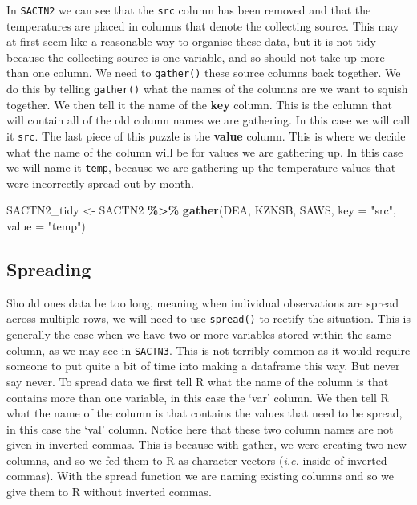 \documentclass[
]{book}
\newenvironment{Shaded}{\begin{snugshade}}{\end{snugshade}}
\newcommand{\DataTypeTok}[1]{\textcolor[rgb]{0.13,0.29,0.53}{#1}}
\newcommand{\KeywordTok}[1]{\textcolor[rgb]{0.13,0.29,0.53}{\textbf{#1}}}
\newcommand{\NormalTok}[1]{#1}
\newcommand{\OperatorTok}[1]{\textcolor[rgb]{0.81,0.36,0.00}{\textbf{#1}}}
\newcommand{\StringTok}[1]{\textcolor[rgb]{0.31,0.60,0.02}{#1}}
\begin{document}
In \texttt{SACTN2} we can see that the \texttt{src} column has been removed and that the temperatures are placed in columns that denote the collecting source. This may at first seem like a reasonable way to organise these data, but it is not tidy because the collecting source is one variable, and so should not take up more than one column. We need to \texttt{gather()} these source columns back together. We do this by telling \texttt{gather()} what the names of the columns are we want to squish together. We then tell it the name of the \textbf{key} column. This is the column that will contain all of the old column names we are gathering. In this case we will call it \texttt{src}. The last piece of this puzzle is the \textbf{value} column. This is where we decide what the name of the column will be for values we are gathering up. In this case we will name it \texttt{temp}, because we are gathering up the temperature values that were incorrectly spread out by month.

\begin{Shaded}
\begin{Highlighting}[]
\NormalTok{SACTN2\_tidy <{-}}\StringTok{ }\NormalTok{SACTN2 }\OperatorTok{\%>\%}
\StringTok{  }\KeywordTok{gather}\NormalTok{(DEA, KZNSB, SAWS, }\DataTypeTok{key =} \StringTok{"src"}\NormalTok{, }\DataTypeTok{value =} \StringTok{"temp"}\NormalTok{)}
\end{Highlighting}
\end{Shaded}

\hypertarget{spreading}{%
\subsection{Spreading}\label{spreading}}

Should ones data be too long, meaning when individual observations are spread across multiple rows, we will need to use \texttt{spread()} to rectify the situation. This is generally the case when we have two or more variables stored within the same column, as we may see in \texttt{SACTN3}. This is not terribly common as it would require someone to put quite a bit of time into making a dataframe this way. But never say never. To spread data we first tell R what the name of the column is that contains more than one variable, in this case the `var' column. We then tell R what the name of the column is that contains the values that need to be spread, in this case the `val' column. Notice here that these two column names are not given in inverted commas. This is because with gather, we were creating two new columns, and so we fed them to R as character vectors (\emph{i.e.} inside of inverted commas). With the spread function we are naming existing columns and so we give them to R without inverted commas.
\end{document}
